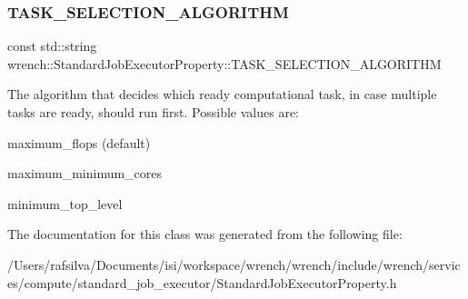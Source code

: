 \subsubsection{\texorpdfstring{T\+A\+S\+K\+\_\+\+S\+E\+L\+E\+C\+T\+I\+O\+N\+\_\+\+A\+L\+G\+O\+R\+I\+T\+HM}{TASK\_SELECTION\_ALGORITHM}}
{\footnotesize\ttfamily const std\+::string wrench\+::\+Standard\+Job\+Executor\+Property\+::\+T\+A\+S\+K\+\_\+\+S\+E\+L\+E\+C\+T\+I\+O\+N\+\_\+\+A\+L\+G\+O\+R\+I\+T\+HM\hspace{0.3cm}{\ttfamily [static]}}



The algorithm that decides which ready computational task, in case multiple tasks are ready, should run first. Possible values are\+: 


\begin{DoxyItemize}
\item maximum\+\_\+flops (default)
\item maximum\+\_\+minimum\+\_\+cores
\item minimum\+\_\+top\+\_\+level 
\end{DoxyItemize}

The documentation for this class was generated from the following file\+:\begin{DoxyCompactItemize}
\item 
/\+Users/rafsilva/\+Documents/isi/workspace/wrench/wrench/include/wrench/services/compute/standard\+\_\+job\+\_\+executor/Standard\+Job\+Executor\+Property.\+h\end{DoxyCompactItemize}
